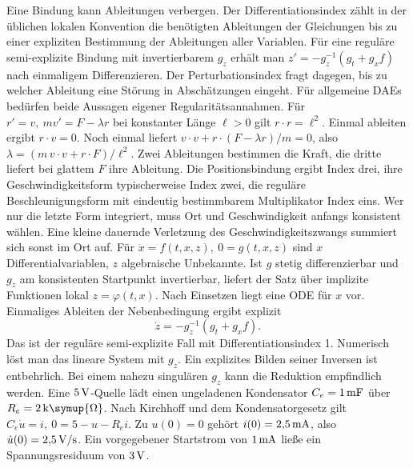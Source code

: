 \hypertarget{punkt4-2-1}{}
Eine Bindung kann Ableitungen verbergen. Der Differentiationsindex zählt in der üblichen lokalen Konvention die benötigten Ableitungen der Gleichungen bis zu einer expliziten Bestimmung der Ableitungen aller Variablen. Für eine reguläre semi-explizite Bindung mit invertierbarem \(g_z\) erhält man \(z'=-g_z^{-1}(g_t+g_x f)\) nach einmaligem Differenzieren. Der Perturbationsindex fragt dagegen, bis zu welcher Ableitung eine Störung in Abschätzungen eingeht. Für allgemeine DAEs bedürfen beide Aussagen eigener Regularitätsannahmen.
\hypertarget{punkt4-2-2}{}
Für \(r'=v,\ m v'=F-\lambda r\) bei konstanter Länge \(\ell>0\) gilt \(r\cdot r=\ell^2\). Einmal ableiten ergibt \(r\cdot v=0\). Noch einmal liefert \(v\cdot v+r\cdot(F-\lambda r)/m=0\), also \(\lambda=(m\,v\cdot v+r\cdot F)/\ell^2\). Zwei Ableitungen bestimmen die Kraft, die dritte liefert bei glattem \(F\) ihre Ableitung.
\hypertarget{punkt4-2-3}{}
Die Positionsbindung ergibt Index drei, ihre Geschwindigkeitsform typischerweise Index zwei, die reguläre Beschleunigungsform mit eindeutig bestimmbarem Multiplikator Index eins. Wer nur die letzte Form integriert, muss Ort und Geschwindigkeit anfangs konsistent wählen. Eine kleine dauernde Verletzung des Geschwindigkeitszwangs summiert sich sonst im Ort auf.
Für \(\dot x=f(t,x,z),\ 0=g(t,x,z)\) sind \(x\) Differentialvariablen, \(z\) algebraische Unbekannte. Ist \(g\) stetig differenzierbar und \(g_z\) am konsistenten Startpunkt invertierbar, liefert der Satz über implizite Funktionen lokal \(z=\varphi(t,x)\). Nach Einsetzen liegt eine ODE für \(x\) vor. Einmaliges Ableiten der Nebenbedingung ergibt explizit
\[
 \dot z=-g_z^{-1}(g_t+g_x f).
\]
Das ist der reguläre semi-explizite Fall mit Differentiationsindex 1. Numerisch löst man das lineare System mit \(g_z\). Ein explizites Bilden seiner Inversen ist entbehrlich. Bei einem nahezu singulären \(g_z\) kann die Reduktion empfindlich werden.
Eine \(5\,\mathrm{V}\)-Quelle lädt einen ungeladenen Kondensator \(C_e=1\,\mathrm{mF}\) über \(R_e=2\,\mathrm{k}\symup{\Omega}\). Nach Kirchhoff und dem Kondensatorgesetz gilt \(C_e\dot u=i,\ 0=5-u-R_ei\). Zu \(u(0)=0\) gehört \(i(0)=2{,}5\,\mathrm{mA}\), also \(\dot u(0)=2{,}5\,\mathrm{V/s}\). Ein vorgegebener Startstrom von \(1\,\mathrm{mA}\) ließe ein Spannungsresiduum von \(3\,\mathrm{V}\).

